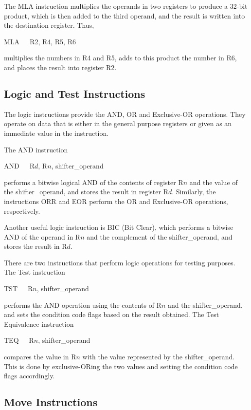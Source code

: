\documentclass[11pt, twoside, pdftex]{article}
\begin{document}
The MLA instruction multiplies the operands in two registers
to produce a 32-bit product, which is then added to the third 
operand, and the result is written into the destination register. Thus,
\begin{center}
MLA~~~R2, R4, R5, R6
\end{center}
\noindent
multiplies the numbers in R4 and R5, adds to this product the 
number in R6, and places the result into register R2.

 
\subsection{Logic and Test Instructions}

The logic instructions provide the AND, OR and Exclusive-OR
operations. They operate on data
that is either in the general purpose registers or given as an immediate value in the instruction. 

\noindent
The AND instruction
\begin{center}
AND~~~R$d$, R$n$, shifter\_operand 
\end{center}
\noindent
performs a bitwise logical AND of the contents of register R$n$ and the value of the shifter\_operand, and stores the result in
register R$d$. Similarly, the instructions ORR and EOR perform
the OR and Exclusive-OR operations, respectively.

Another useful logic instruction is BIC (Bit Clear),
which performs a bitwise AND of the operand in R$n$ and the
complement of the shifter\_operand, and stores 
the result in R$d$.

There are two instructions that perform logic operations for 
testing purposes. The Test instruction
\begin{center}
TST~~~R$n$, shifter\_operand
\end{center}
\noindent 
performs the AND operation using the contents of R$n$ and
the shifter\_operand, and sets the condition code flags
based on the result obtained. The Test Equivalence instruction
\begin{center}
TEQ~~~R$n$, shifter\_operand
\end{center}
\noindent
compares the value in R$n$ with the value represented by the
shifter\_operand. This is done by exclusive-ORing the two values
and setting the condition code flags accordingly.

\subsection{Move Instructions}
\end{document}
